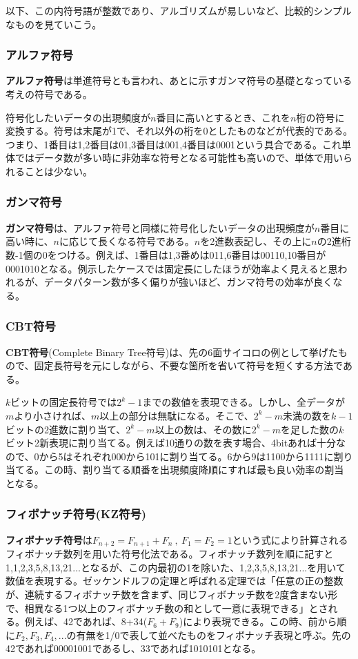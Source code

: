 以下、この内符号語が整数であり、アルゴリズムが易しいなど、比較的シンプルなものを見ていこう。

\subsubsection{アルファ符号}
\textbf{アルファ符号}は単進符号とも言われ、あとに示すガンマ符号の基礎となっている考えの符号である。

符号化したいデータの出現頻度が$n$番目に高いとするとき、これを$n$桁の符号に変換する。符号は末尾が1で、それ以外の桁を0としたものなどが代表的である。つまり、1番目は1,2番目は01,3番目は001,4番目は0001という具合である。これ単体ではデータ数が多い時に非効率な符号となる可能性も高いので、単体で用いられることは少ない。

\subsubsection{ガンマ符号}
\textbf{ガンマ符号}は、アルファ符号と同様に符号化したいデータの出現頻度が$n$番目に高い時に、$n$に応じて長くなる符号である。$n$を2進数表記し、その上に$n$の2進桁数-1個の0をつける。例えば、1番目は1,3番めは011,6番目は00110,10番目が0001010となる。例示したケースでは固定長にしたほうが効率よく見えると思われるが、データパターン数が多く偏りが強いほど、ガンマ符号の効率が良くなる。

\subsubsection{CBT符号}
\textbf{CBT符号}(Complete Binary Tree符号)は、先の6面サイコロの例として挙げたもので、固定長符号を元にしながら、不要な箇所を省いて符号を短くする方法である。

$k$ビットの固定長符号では$2^k-1$までの数値を表現できる。しかし、全データが$m$より小さければ、$m$以上の部分は無駄になる。そこで、$2^k-m$未満の数を$k-1$ビットの2進数に割り当て、$2^k-m$以上の数は、その数に$2^k-m$を足した数の$k$ビット2新表現に割り当てる。例えば10通りの数を表す場合、4bitあれば十分なので、0から5はそれぞれ000から101に割り当てる。6から9は1100から1111に割り当てる。この時、割り当てる順番を出現頻度降順にすれば最も良い効率の割当となる。

\subsubsection{フィボナッチ符号(KZ符号)}
\textbf{フィボナッチ符号}は$F_{n+2}=F_{n+1}+F_n\ ,\ F_1=F_2=1$という式により計算されるフィボナッチ数列を用いた符号化法である。フィボナッチ数列を順に記すと1,1,2,3,5,8,13,21...となるが、この内最初の1を除いた、1,2,3,5,8,13,21...を用いて数値を表現する。ゼッケンドルフの定理と呼ばれる定理では「任意の正の整数が、連続するフィボナッチ数を含まず、同じフィボナッチ数を2度含まない形で、相異なる1つ以上のフィボナッチ数の和として一意に表現できる」とされる。例えば、42であれば、8+34($F_6+F_9$)により表現できる。この時、前から順に$F_2,F_3,F_4,...$の有無を1/0で表して並べたものをフィボナッチ表現と呼ぶ。先の42であれば00001001であるし、33であれば1010101となる。

